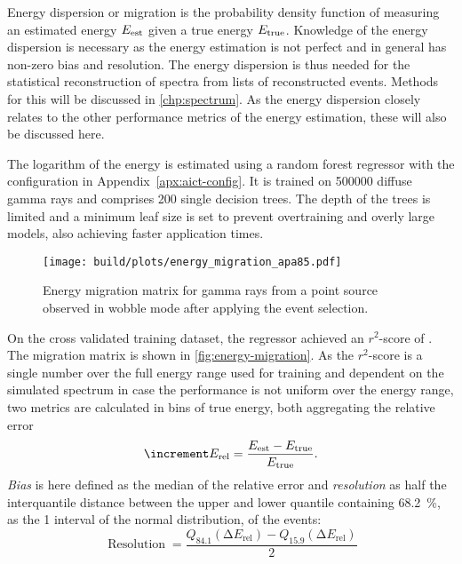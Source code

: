 Energy dispersion or migration is the probability density function 
of measuring an estimated energy $\Eest$ given a true energy $\Etrue$.
Knowledge of the energy dispersion is necessary as the energy estimation 
is not perfect and in general has non-zero bias and resolution.
The energy dispersion is thus needed for the statistical reconstruction of spectra
from lists of reconstructed events. 
Methods for this will be discussed in \autoref{chp:spectrum}.
As the energy dispersion closely relates to the other performance metrics of the energy estimation,
these will also be discussed here.

The logarithm of the energy is estimated using a random forest regressor with the configuration
in Appendix~\ref{apx:aict-config}.
It is trained on \num{500000} diffuse gamma rays and comprises \num{200} single
decision trees.
The depth of the trees is limited and a minimum leaf size is set to prevent overtraining
and overly large models, also achieving faster application times.

\begin{figure}
  \centering
  \texttt{[image: build/plots/energy\_migration\_apa85.pdf]}
  \caption{%
    Energy migration matrix for gamma rays from a point source observed in
    wobble mode after applying the event selection.
  }\label{fig:energy-migration}
\end{figure}

On the cross validated training dataset, the regressor achieved an $r^2$-score of
\unskip.
The migration matrix is shown in \autoref{fig:energy-migration}.
As the $r^2$-score is a single number over the full energy range used for training and
dependent on the simulated spectrum in case the performance is not uniform over the 
energy range, two metrics are calculated
in bins of true energy, both aggregating the relative error 
\begin{equation}
  \increment E_{\text{rel}} = \frac{\Eest - \Etrue}{\Etrue}.
\end{equation}
\emph{Bias} is here defined as the median of the relative error and \emph{resolution}
as half the interquantile distance between the upper and lower quantile containing
\SI{68.2}{\percent}, as the \SI{1}{\sigma} interval of the normal distribution, of the events:
\begin{equation}
  \operatorname{Resolution} = \frac{Q_{84.1}(\increment E_{\text{rel}}) - Q_{15.9}(\increment E_{\text{rel}})}{2}
\end{equation}

